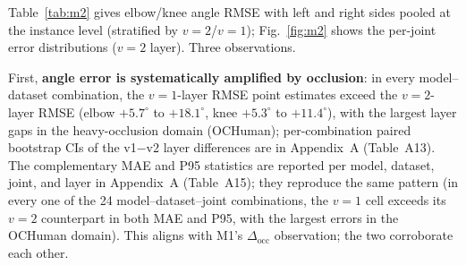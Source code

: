 \documentclass[10pt,conference]{IEEEtran}
\begin{document}
Table~\ref{tab:m2} gives elbow/knee angle RMSE with left and right sides pooled at the instance level (stratified by $v{=}2$/$v{=}1$); Fig.~\ref{fig:m2} shows the per-joint error distributions ($v{=}2$ layer). Three observations.

\begin{table}[t]
\centering
\caption{M2 joint-angle RMSE ($^{\circ}$, instances pooled per side). Bold $=$ significantly better (bootstrap CI excludes 0); per-comparison CIs are in Appendix~A (Table~A3).}
\label{tab:m2}
\renewcommand{\arraystretch}{1.15}
\end{table}

First, \textbf{angle error is systematically amplified by occlusion}: in every model--dataset combination, the $v{=}1$-layer RMSE point estimates exceed the $v{=}2$-layer RMSE (elbow $+5.7^{\circ}$ to $+18.1^{\circ}$, knee $+5.3^{\circ}$ to $+11.4^{\circ}$), with the largest layer gaps in the heavy-occlusion domain (OCHuman); per-combination paired bootstrap CIs of the v1$-$v2 layer differences are in Appendix~A (Table~A13). The complementary MAE and P95 statistics are reported per model, dataset, joint, and layer in Appendix~A (Table~A15); they reproduce the same pattern (in every one of the 24 model--dataset--joint combinations, the $v{=}1$ cell exceeds its $v{=}2$ counterpart in both MAE and P95, with the largest errors in the OCHuman domain). This aligns with M1's $\Delta_{\mathrm{occ}}$ observation; the two corroborate each other.
\end{document}
